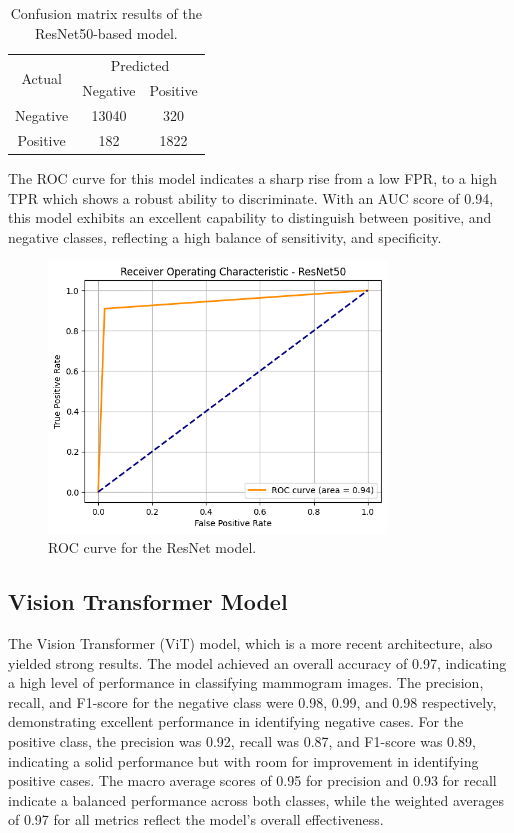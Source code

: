 \documentclass[../main]{subfiles}
\begin{document}
\begin{table}[h]
    \centering
    \begin{tabular}{|c|c|c|}
        \hline
        \multirow{2}{*}{Actual} & \multicolumn{2}{c|}{Predicted} \\ \cline{2-3}
                                & Negative         & Positive         \\ \hline
        Negative                & 13040            & 320              \\ \hline
        Positive                & 182              & 1822              \\ \hline
    \end{tabular}
    \caption{Confusion matrix results of the ResNet50-based model.}
    \label{tab:confusion-matrix-resnet}
\end{table}

\noindent The ROC curve for this model indicates a sharp rise from a low FPR, to a high TPR which shows a robust ability to discriminate. With an AUC score of 0.94, this model exhibits an excellent capability to distinguish between positive, and negative classes, reflecting a high balance of sensitivity, and specificity.

\begin{figure}[h]
	\centering
	\includegraphics[width=0.8\textwidth]{assets/roc_resnet.png}
	\caption{ROC curve for the ResNet model.}
    \label{fig:roc-resnet}
\end{figure}

\subsection{Vision Transformer Model}
The Vision Transformer (ViT) model, which is a more recent architecture, also yielded strong results. The model achieved an overall accuracy of 0.97, indicating a high level of performance in classifying mammogram images. The precision, recall, and F1-score for the negative class were 0.98, 0.99, and 0.98 respectively, demonstrating excellent performance in identifying negative cases. For the positive class, the precision was 0.92, recall was 0.87, and F1-score was 0.89, indicating a solid performance but with room for improvement in identifying positive cases. The macro average scores of 0.95 for precision and 0.93 for recall indicate a balanced performance across both classes, while the weighted averages of 0.97 for all metrics reflect the model's overall effectiveness.
\end{document}
